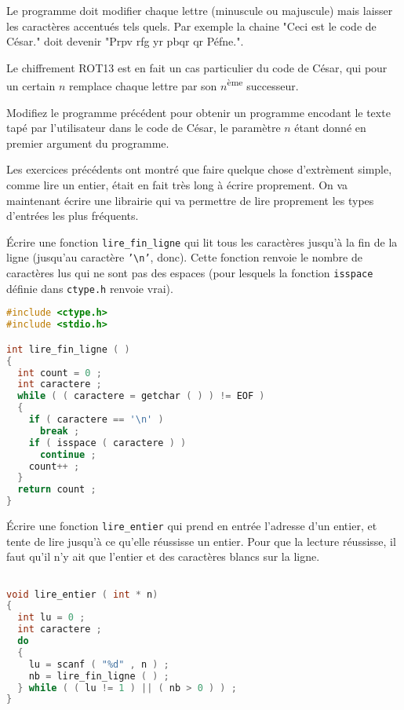 Le programme doit modifier chaque lettre (minuscule ou majuscule) mais
laisser les caractères accentués tels quels. Par exemple la chaine
"Ceci est le code de César." doit devenir "Prpv rfg yr pbqr qr
Péfne.".

Le chiffrement ROT13 est en fait un cas particulier du code de César,
qui pour un certain $n$ remplace chaque lettre par son $n$\textsuperscript{ème} successeur.

\question Modifiez le programme précédent pour obtenir un programme
encodant le texte tapé par l'utilisateur dans le code de César, le
paramètre $n$ étant donné en premier argument du programme.


Les exercices précédents ont montré que faire quelque chose
d'extrèment simple, comme lire un entier, était en fait très long à
écrire proprement. On va maintenant écrire une librairie qui va permettre
de lire proprement les types d'entrées les plus fréquents.

\question Écrire une fonction \texttt{lire\_fin\_ligne} qui lit tous
les caractères jusqu'à la fin de la ligne (jusqu'au caractère
\texttt{'\textbackslash n'}, donc). Cette fonction renvoie le nombre
de caractères lus qui ne sont pas des espaces (pour lesquels la
fonction \texttt{isspace} définie dans \texttt{ctype.h} renvoie vrai).



\begin{solutioncachee}
  \begin{lstlisting}[language=C]
#include <ctype.h>
#include <stdio.h>

int lire_fin_ligne ( ) 
{
  int count = 0 ;
  int caractere ;
  while ( ( caractere = getchar ( ) ) != EOF )
  {
    if ( caractere == '\n' )
      break ;
    if ( isspace ( caractere ) )
      continue ;
    count++ ;
  }
  return count ;
}
  \end{lstlisting}
\end{solutioncachee}

\question Écrire une fonction \texttt{lire\_entier} qui prend en
entrée l'adresse d'un entier, et tente de lire jusqu'à ce qu'elle
réussisse un entier. Pour que la lecture réussisse, il faut qu'il n'y
ait que l'entier et des caractères blancs sur la ligne.

\begin{solutioncachee}
  \begin{lstlisting}[language=C]

void lire_entier ( int * n) 
{
  int lu = 0 ;
  int caractere ;
  do
  {
    lu = scanf ( "%d" , n ) ;
    nb = lire_fin_ligne ( ) ;
  } while ( ( lu != 1 ) || ( nb > 0 ) ) ;
}
  \end{lstlisting}
\end{solutioncachee}

